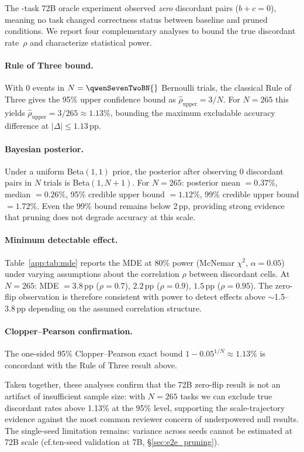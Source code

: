 The \qwenSevenTwoBN{}-task 72B oracle experiment observed \emph{zero} discordant pairs ($b + c = 0$), meaning no task changed correctness status between baseline and pruned conditions.
We report four complementary analyses to bound the true discordant rate~$\rho$ and characterize statistical power.

\paragraph{Rule of Three bound.}
With 0 events in $N = \qwenSevenTwoBN{}$ Bernoulli trials, the classical Rule of Three gives the 95\% upper confidence bound as
$\hat\rho_{\text{upper}} = 3/N$.
For $N = 265$ this yields $\hat\rho_{\text{upper}} = 3/265 \approx 1.13\%$, bounding the maximum excludable accuracy difference at $|\Delta| \leq 1.13$\,pp.

\paragraph{Bayesian posterior.}
Under a uniform Beta$(1,1)$ prior, the posterior after observing 0 discordant pairs in $N$ trials is Beta$(1, N{+}1)$.
For $N = 265$: posterior mean $= 0.37\%$, median $= 0.26\%$, 95\% credible upper bound $= 1.12\%$, 99\% credible upper bound $= 1.72\%$.
Even the 99\% bound remains below 2\,pp, providing strong evidence that pruning does not degrade accuracy at this scale.

\paragraph{Minimum detectable effect.}
Table~\ref{app:tab:mde} reports the MDE at 80\% power (McNemar $\chi^2$, $\alpha=0.05$) under varying assumptions about the correlation $\rho$ between discordant cells.
At $N = 265$: MDE $= 3.8$\,pp ($\rho = 0.7$), $2.2$\,pp ($\rho = 0.9$), $1.5$\,pp ($\rho = 0.95$).
The zero-flip observation is therefore consistent with power to detect effects above $\sim$1.5--3.8\,pp depending on the assumed correlation structure.

\paragraph{Clopper--Pearson confirmation.}
The one-sided 95\% Clopper--Pearson exact bound $1 - 0.05^{1/N} \approx 1.13\%$ is concordant with the Rule of Three result above.

Taken together, these analyses confirm that the 72B zero-flip result is not an artifact of insufficient sample size: with $N = 265$ tasks we can exclude true discordant rates above 1.13\% at the 95\% level, supporting the scale-trajectory evidence against the most common reviewer concern of underpowered null results.
The single-seed limitation remains: variance across seeds cannot be estimated at 72B scale (cf.\@ ten-seed validation at 7B, \S\ref{sec:e2e_pruning}).